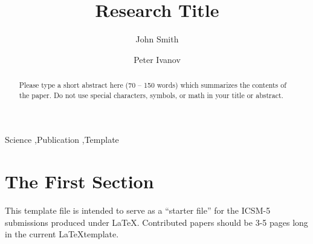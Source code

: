 \documentclass[final,11pt,3p]{elsarticle}
\begin{document}
\begin{frontmatter}


\title{Research Title}




\author[label1]{John Smith}
\author[label2,label3]{Peter Ivanov}
\address[label1]{Organization name 1, Santa Barbara, California, United States}
\address[label2]{Organization name 2, Moscow, Russian Federation}
\address[label3]{Organization name 3, Volgograd, Russian Federation}

\begin{abstract}
Please type a short abstract here (70 -- 150 words) which summarizes the contents of the paper.
Do not use special characters, symbols, or math in your title
or abstract. 
\end{abstract}

\begin{keyword}
Science \sep Publication \sep Template


\end{keyword}

\end{frontmatter}
\pagestyle{empty}

\section{The First Section}
\label{S:1}
This template file is intended to serve as a ``starter file'' for the ICSM-5 submissions produced under \LaTeX. Contributed papers should be 3-5 pages long in the current \LaTeX template.
\end{document}
